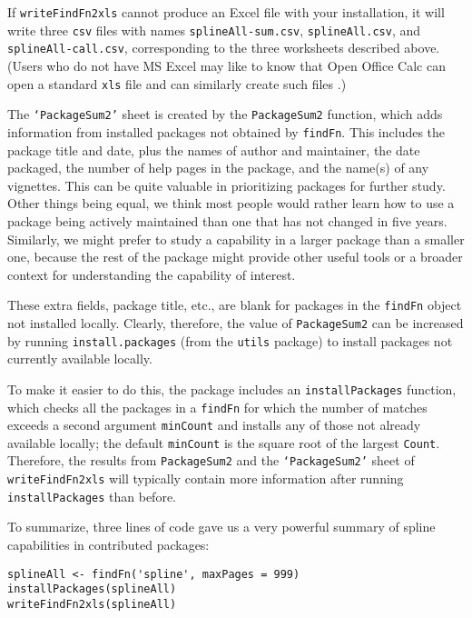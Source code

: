 If {\tt writeFindFn2xls} cannot produce an Excel file with
your installation, it will write three {\tt csv} files with
names {\tt splineAll-sum.csv}, {\tt splineAll.csv}, and
{\tt splineAll-call.csv}, corresponding to the three
worksheets described above. (Users who do not have MS Excel
may like to know that Open Office Calc can open a standard
{\tt xls} file and can similarly create such files
\citep{CALC09MAN}.)

The {\tt `PackageSum2'} sheet is created by the
{\tt PackageSum2} function, which adds information from
installed packages not obtained by
{\tt findFn}.  This includes the package title and date, plus
the names of author and maintainer,
the date packaged, the number of help pages in the package,
and the name(s) of any vignettes.  This can be quite
valuable in prioritizing packages for further study.
Other things being equal, we think most people would
rather learn how to use a package being actively maintained
than one that has not changed in five years.  Similarly,
we might prefer to study a capability in a larger package
than a smaller one, because the rest of the package might
provide other useful tools or a broader context for
understanding the capability of interest.

These extra fields, package title, etc., are blank for
packages in the {\tt findFn} object not installed locally.
Clearly, therefore, the value of {\tt PackageSum2} can be
increased by running {\tt install.packages} (from the
{\tt utils} package) to install packages not currently
available locally.

To make it easier to do this, the  package includes
an {\tt installPackages} function, which checks all the
packages in a {\tt findFn} for which
the number of matches exceeds a second argument {\tt minCount}
and installs any of those not already available locally;  the
default {\tt minCount} is the square root of the largest
{\tt Count}.  Therefore, the results from {\tt PackageSum2} and the
{\tt `PackageSum2'} sheet of {\tt writeFindFn2xls} will typically
contain more information after running {\tt installPackages}
than before.

To summarize, three lines of code gave us a very powerful
summary of spline capabilities in contributed \R{}
packages:

\begin{verbatim}
splineAll <- findFn('spline', maxPages = 999)
installPackages(splineAll)
writeFindFn2xls(splineAll)
\end{verbatim}

